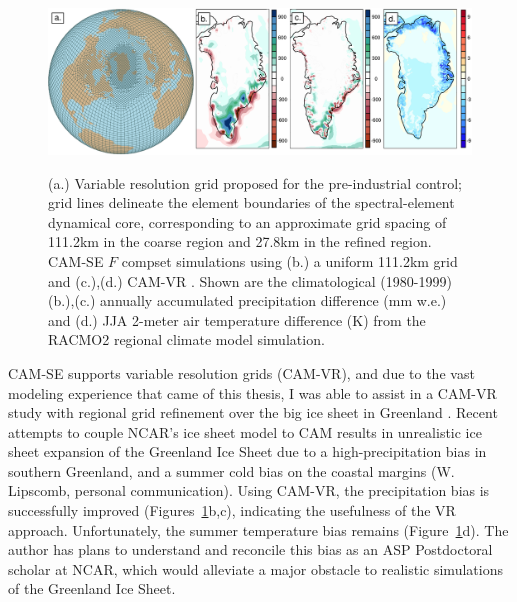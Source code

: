 \begin{figure}[t]
\begin{center}
\noindent\includegraphics[width=33pc,angle=0]{chapter7/asp_panel.png}\\
\end{center}
\caption{(a.) Variable resolution grid proposed for the pre-industrial control; grid lines delineate the element boundaries of the spectral-element dynamical core, corresponding to an approximate grid spacing of 111.2km in the coarse region and 27.8km in the refined region. CAM-SE $F$ compset simulations using (b.) a uniform 111.2km grid and (c.),(d.) CAM-VR \citep{VETAL2018TC}. Shown are the climatological (1980-1999) (b.),(c.) annually accumulated precipitation difference (mm w.e.) and (d.) JJA 2-meter air temperature difference (K) from the RACMO2 regional climate model simulation.}
\label{fig:se-mesh}
\end{figure}

CAM-SE supports variable resolution grids (CAM-VR), and due to the vast modeling experience that came of this thesis, I was able to assist in a CAM-VR study with regional grid refinement over the big ice sheet in Greenland \citep[Figure~\ref{fig:se-mesh}a;][]{VETAL2018TC}. Recent attempts to couple NCAR's ice sheet model to CAM results in unrealistic ice sheet expansion of the Greenland Ice Sheet due to a high-precipitation bias in southern Greenland, and a summer cold bias on the coastal margins (W. Lipscomb, personal communication). Using CAM-VR, the precipitation bias is successfully improved (Figures~\ref{fig:se-mesh}b,c), indicating the usefulness of the VR approach. Unfortunately, the summer temperature bias remains (Figure~\ref{fig:se-mesh}d). The author has plans to understand and reconcile this bias as an ASP Postdoctoral scholar at NCAR, which would alleviate a major obstacle to realistic simulations of the Greenland Ice Sheet.